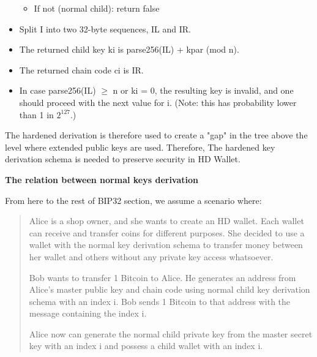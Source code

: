 \begin{adjustwidth}{0.5cm}{}
\begin{itemize}
\begin{itemize}
                  \item If not (normal child): return false

              \end{itemize}
              \bigskip

        \item Split I into two 32-byte sequences, IL and IR.
              \bigskip

        \item The returned child key ki is parse256(IL) + kpar (mod n).
              \bigskip

        \item The returned chain code ci is IR.
              \bigskip

        \item In case parse256(IL) $\geq$ n or ki = 0, the resulting key is invalid, and one should proceed with the next value for i. (Note: this has probability lower than 1 in $2^{127}$.)

    \end{itemize}

    The hardened derivation is therefore used to create a "gap" in the tree above the level where extended public keys are used. Therefore, The hardened key derivation schema is needed to preserve security in HD Wallet.
\end{adjustwidth}

\bigskip
{\textbf{The relation between normal keys derivation}}

From here to the rest of BIP32 section, we assume a scenario where:

\begin{quote}
    Alice is a shop owner, and she wants to create an HD wallet. Each wallet can receive and transfer coins for different purposes. She decided to use a wallet with the normal key derivation schema to transfer money between her wallet and others without any private key access whatsoever.

    Bob wants to transfer 1 Bitcoin to Alice. He generates an address from Alice's master public key and chain code using normal child key derivation schema with an index i. Bob sends 1 Bitcoin to that address with the message containing the index i.

    Alice now can generate the normal child private key from the master secret key with an index i and possess a child wallet with an index i.

\end{quote}

